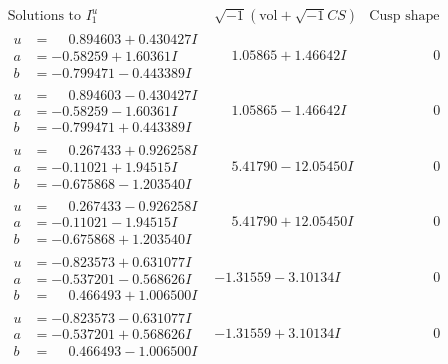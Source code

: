 \documentclass[1p]{elsarticle_modified}
\theoremstyle{definition}
\newcommand{\I}{\sqrt{-1}}
\begin{document}
$$\begin{array}{c|c|c}  
\text{Solutions to }I^u_{1}& \I (\text{vol} + \sqrt{-1}CS) & \text{Cusp shape}\\
 \hline 
\begin{aligned}
u &= \phantom{-}0.894603 + 0.430427 I \\
a &= -0.58259 + 1.60361 I \\
b &= -0.799471 - 0.443389 I\end{aligned}
 & \phantom{-}1.05865 + 1.46642 I & \phantom{-0.000000 } 0 \\ \hline\begin{aligned}
u &= \phantom{-}0.894603 - 0.430427 I \\
a &= -0.58259 - 1.60361 I \\
b &= -0.799471 + 0.443389 I\end{aligned}
 & \phantom{-}1.05865 - 1.46642 I & \phantom{-0.000000 } 0 \\ \hline\begin{aligned}
u &= \phantom{-}0.267433 + 0.926258 I \\
a &= -0.11021 + 1.94515 I \\
b &= -0.675868 - 1.203540 I\end{aligned}
 & \phantom{-}5.41790 - 12.05450 I & \phantom{-0.000000 } 0 \\ \hline\begin{aligned}
u &= \phantom{-}0.267433 - 0.926258 I \\
a &= -0.11021 - 1.94515 I \\
b &= -0.675868 + 1.203540 I\end{aligned}
 & \phantom{-}5.41790 + 12.05450 I & \phantom{-0.000000 } 0 \\ \hline\begin{aligned}
u &= -0.823573 + 0.631077 I \\
a &= -0.537201 - 0.568626 I \\
b &= \phantom{-}0.466493 + 1.006500 I\end{aligned}
 & -1.31559 - 3.10134 I & \phantom{-0.000000 } 0 \\ \hline\begin{aligned}
u &= -0.823573 - 0.631077 I \\
a &= -0.537201 + 0.568626 I \\
b &= \phantom{-}0.466493 - 1.006500 I\end{aligned}
 & -1.31559 + 3.10134 I & \phantom{-0.000000 } 0 \\ \hline\begin{aligned}

\end{aligned}
\end{array}$$
\end{document}
